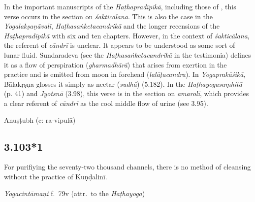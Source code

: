 \begin{ekdosis}
\begin{philcomm}[hp03_103]
In the important manuscripts of the \emph{Haṭhapradīpikā}, including those of \textalpha, this verse occurs in the section on \emph{śakticālana}. This is also the case in the \emph{Yogalakṣaṇāvalī}, \emph{Haṭhasaṅketacandrikā} and the longer recensions of the \emph{Haṭhapradīpikā} with six and ten chapters. However, in the context of \emph{śakticālana}, the referent of \emph{cāndrī} is unclear. It appears to be understood as some sort of lunar fluid. Sundaradeva (see the \emph{Haṭhasaṅketacandrikā} in the testimonia) defines it as a flow of perspiration (\emph{gharmadhārā}) that arises from exertion in the practice and is emitted from moon in forehead (\emph{lalāṭacandra}). In \emph{Yogaprakāśikā}, Bālakṛṣṇa glosses it simply as nectar (\emph{sudhā}) (5.182). In the \emph{Haṭhayogasaṃhitā} (p. 41) and \emph{Jyotsnā} (3.98), this verse is in the section on \emph{amarolī}, which provides a clear referent of \emph{cāndrī} as the cool middle flow of urine (see 3.95).  

\end{philcomm}

\begin{metre}[hp03_103]
Anuṣṭubh (c: ra-vipulā)
\end{metre}

\subsection*{3.103*1}
\begin{translation}[hp03_103_1]
For purifiying the seventy-two thousand channels, there is no method of cleansing without the practice of Kuṇḍalinī.
\end{translation}

\begin{testimonia}[hp03_103_1]
\emph{Yogacintāmaṇi} f.~79v (attr.~to the \emph{Haṭhayoga})
\begin{versinnote}
\end{versinnote}


\end{testimonia}
\end{ekdosis}
